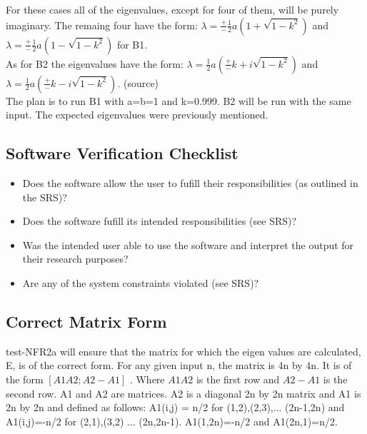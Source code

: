 \documentclass[12pt, titlepage]{article}
\begin{document}
For these cases all of the eigenvalues, except for four of them, will be purely 
imaginary. The remaing four have the form: $\lambda = \frac{+}{-} \frac{1}{2} a 
(1+\sqrt{1-k^{2}})$ and $\lambda = \frac{+}{-} \frac{1}{2} a 
(1-\sqrt{1-k^{2}})$ for B1. \\ 
As for B2 the eigenvalues have the form:  $\lambda =  \frac{1}{2} a 
(\frac{+}{-}k+ i \sqrt{1-k^{2}})$ and $\lambda = \frac{1}{2} a 
(\frac{+}{-}k - i \sqrt{1-k^{2}})$. (source) \\ 
The plan is to run B1 with a=b=1 and k=0.999. B2 will be run with the same 
input. The expected eigenvalues were previously mentioned. 

\subsection{Software Verification Checklist} 

\begin{itemize}
	\item Does the software allow the user to fufill their responsibilities 
	(as outlined in the SRS)?
	\item Does the software fufill its intended responsibilities (see SRS)?
	\item Was the intended user able to use the software and interpret the 
	output for their research purposes?
	\item Are any of the system constraints violated (see SRS)?
\end{itemize}  

\subsection{Correct Matrix Form} 

test-NFR2a will ensure that the matrix for which the eigen values are 
calculated, E, is of the correct form. For any given input n, the matrix is 4n 
by 4n. It is of the form $ [A1 A2; A2 -A1] $ . Where $ A1 A2$ is the first row 
and $A2 -A1$ is the second row. A1 and A2 are matrices. A2 is a diagonal 2n by 
2n matrix and A1 is 2n by 2n and defined as follows: A1(i,j) = n/2 for 
(1,2),(2,3),... (2n-1,2n) and A1(i,j)=-n/2 for (2,1),(3,2) ... (2n,2n-1). 
A1(1,2n)=-n/2 and A1(2n,1)=n/2. 
\end{document}

